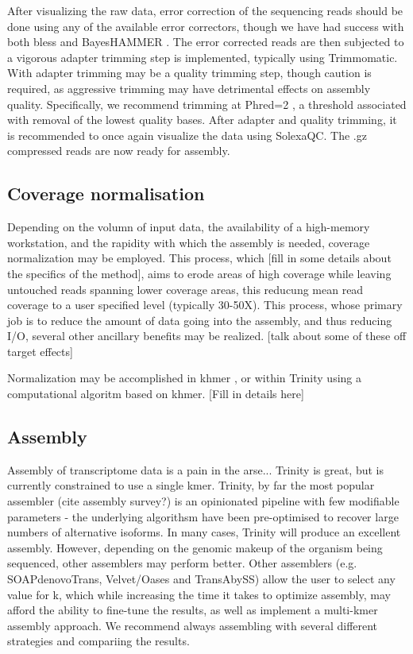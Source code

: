 After visualizing the raw data, error correction of the sequencing reads should be done \citep{MacManes:2013ec} using any of the available error correctors, though we have had success with both bless and BayesHAMMER \citep{Nikolenko:2013iu}. The error corrected reads are then subjected to a vigorous adapter trimming step is implemented, typically using Trimmomatic. With adapter trimming may be a quality trimming step, though caution is required, as aggressive trimming may have detrimental effects on assembly quality. Specifically, we recommend trimming at Phred=2 \citep{MacManes:2014io}, a threshold associated with removal of the lowest quality bases. After adapter and quality trimming, it is recommended to once again visualize the data using SolexaQC. The .gz compressed reads are now ready for assembly. \\

\subsection{Coverage normalisation}

Depending on the volumn of input data, the availability of a high-memory workstation, and the rapidity with which the assembly is needed, coverage normalization may be employed. This process, which [fill in some details about the specifics of the method], aims to erode areas of high coverage while leaving untouched reads spanning lower coverage areas, this reducung mean read coverage to a user specified level (typically 30-50X). This process, whose primary job is to reduce the amount of data going into the assembly, and thus reducing I/O, several other ancillary benefits may be realized. [talk about some of these off target effects]

Normalization may be accomplished in khmer \citep{Pell:2012id}, or within Trinity using a computational algoritm based on khmer. [Fill in details here]

\subsection{Assembly}
Assembly of transcriptome data is a pain in the arse... Trinity is great, but is currently constrained to use a single kmer. Trinity, by far the most popular assembler (cite assembly survey?) is an opinionated pipeline with few modifiable parameters - the underlying algorithsm have been pre-optimised to recover large numbers of alternative isoforms. In many cases, Trinity will produce an excellent assembly. However, depending on the genomic makeup of the organism being sequenced, other assemblers may perform better. Other assemblers (e.g. SOAPdenovoTrans, Velvet/Oases and TransAbySS) allow the user to select any value for k, which while increasing the time it takes to optimize assembly, may afford the ability to fine-tune the results, as well as implement a multi-kmer assembly approach. We recommend always assembling with several different strategies and compariing the results. \\


